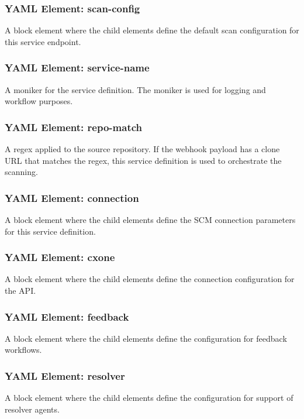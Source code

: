 \subsubsection{YAML Element: scan-config}\label{sec:yaml-moniker-scan-config}
A block element where the child elements define the default scan configuration for this service endpoint.

\subsubsection{YAML Element: service-name}\label{sec:yaml-moniker-service-name}
A moniker for the service definition. The moniker is used for logging and workflow purposes.

\subsubsection{YAML Element: repo-match}\label{sec:yaml-moniker-repo-match}
A regex applied to the source repository.  If the webhook payload has
a clone URL that matches the regex, this service definition is used to orchestrate the scanning.

\subsubsection{YAML Element: connection}\label{sec:yaml-moniker-connection}
A block element where the child elements define the SCM connection parameters for this service definition.

\subsubsection{YAML Element: cxone}\label{sec:yaml-moniker-cxone}
A block element where the child elements define the connection configuration for the \cxone API. 

\subsubsection{YAML Element: feedback}\label{sec:yaml-moniker-feedback}
A block element where the child elements define the configuration for feedback workflows. 

\subsubsection{YAML Element: resolver}\label{sec:yaml-moniker-resolver}
A block element where the child elements define the configuration for support of resolver agents. 

